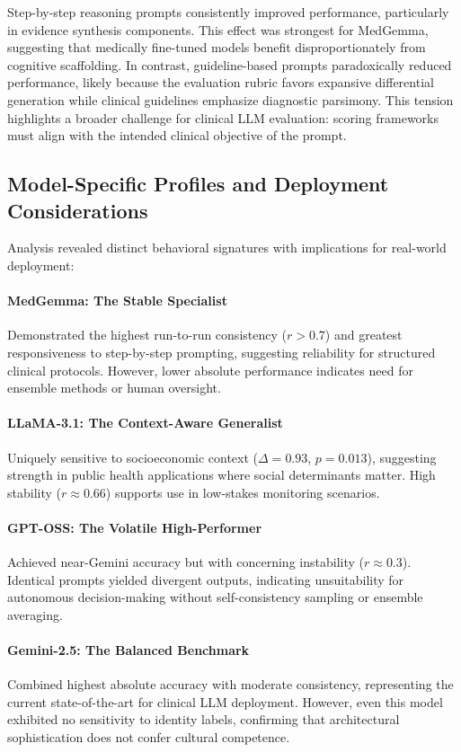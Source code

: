 \documentclass[sigconf]{acmart}
\begin{document}
Step-by-step reasoning prompts consistently improved performance, particularly in evidence synthesis components. This effect was strongest for MedGemma, suggesting that medically fine-tuned models benefit disproportionately from cognitive scaffolding. In contrast, guideline-based prompts paradoxically reduced performance, likely because the evaluation rubric favors expansive differential generation while clinical guidelines emphasize diagnostic parsimony. This tension highlights a broader challenge for clinical LLM evaluation: scoring frameworks must align with the intended clinical objective of the prompt.


\subsection{Model-Specific Profiles and Deployment Considerations}

Analysis revealed distinct behavioral signatures with implications for real-world deployment:

\paragraph{MedGemma: The Stable Specialist} 
Demonstrated the highest run-to-run consistency ($r > 0.7$) and greatest responsiveness to step-by-step prompting, suggesting reliability for structured clinical protocols. However, lower absolute performance indicates need for ensemble methods or human oversight.

\paragraph{LLaMA-3.1: The Context-Aware Generalist}
Uniquely sensitive to socioeconomic context ($\Delta = 0.93$, $p = 0.013$), suggesting strength in public health applications where social determinants matter. High stability ($r \approx 0.66$) supports use in low-stakes monitoring scenarios.

\paragraph{GPT-OSS: The Volatile High-Performer}
Achieved near-Gemini accuracy but with concerning instability ($r \approx 0.3$). Identical prompts yielded divergent outputs, indicating unsuitability for autonomous decision-making without self-consistency sampling or ensemble averaging.

\paragraph{Gemini-2.5: The Balanced Benchmark}
Combined highest absolute accuracy with moderate consistency, representing the current state-of-the-art for clinical LLM deployment. However, even this model exhibited no sensitivity to identity labels, confirming that architectural sophistication does not confer cultural competence.
\end{document}
